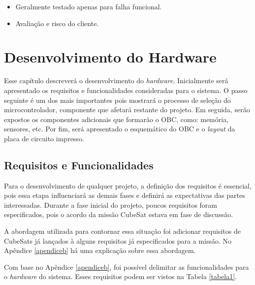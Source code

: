 \begin{itemize}
\begin{itemize}
	\item Geralmente testado apenas para falha funcional.
    \item Avaliação e risco do cliente.

	\end{itemize}
\end{itemize}


\chapter[Desenvolvimento do Hardware]{Desenvolvimento do Hardware}
\label{secaoHardware}
Esse capítulo descreverá o desenvolvimento do \textit{hardware}. Inicialmente será apresentado os requisitos e funcionalidades consideradas para o sistema. O passo seguinte é um dos mais importantes pois mostrará o processo de seleção do microcontrolador, componente que afetará restante do projeto. Em seguida, serão expostos os componentes adicionais que formarão o OBC, como: memória, sensores, etc. Por fim, será apresentado o esquemático do OBC e o \textit{layout} da placa de circuito impresso. 

\section{Requisitos e Funcionalidades}
\label{seção1_1}
Para o desenvolvimento de qualquer projeto, a definição dos requisitos é essencial, pois essa etapa influenciará as demais fases e definirá as expectativas das partes interessadas. Durante a fase inicial do projeto, poucos requisitos foram especificados, pois o acordo da missão CubeSat estava em fase de discussão. 

A abordagem utilizada para contornar essa situação foi adicionar requisitos de CubeSats já lançados à alguns requisitos já especificados para a missão. No Apêndice \ref{apendiceb} há uma explicação sobre essa abordagem. 

Com base no Apêndice \ref{apendiceb}, foi possível delimitar as funcionalidades para o \textit{hardware} do sistema. Esses requisitos podem ser vistos na Tabela \ref{tabela1}.

